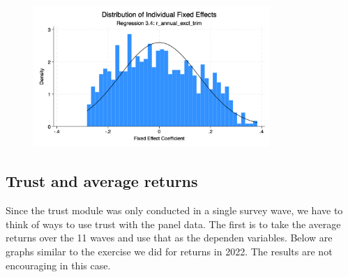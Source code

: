 \begin{figure}[htbp]
\centering
\includegraphics[width=0.8\textwidth]{../Figures/fixed_effects_hist_reg3_4.png}
\end{figure}

\subsection{Trust and average returns}

Since the trust module was only conducted in a single survey wave, we have to think of ways to use trust with the panel data. The first is to take the average returns over the 11 waves and use that as the dependen variables. Below are graphs similar to the exercise we did for returns in 2022. The results are not encouraging in this case. 

\begin{landscape}



\end{landscape}

\begin{landscape}

  


\end{landscape}